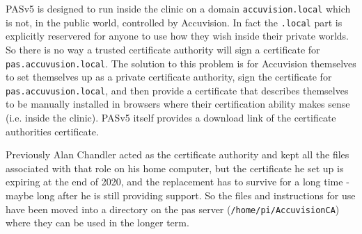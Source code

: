\documentclass[Draft]{akc}
\begin{document}
PASv5 is designed to run inside the clinic on a domain \texttt{accuvision.local} which is not, in the public world, controlled by Accuvision. In
fact the \texttt{.local} part is explicitly reservered for anyone to use how they wish inside their private worlds.  So there is no way a trusted
certificate authority will sign a certificate for \texttt{pas.accuvusion.local}.  The solution to this problem is for Accuvision themselves to set
themselves up as a private certificate authority, sign the certificate for \texttt{pas.accuvusion.local}, and then provide a certificate that describes
themselves to be manually installed in browsers where their certification ability makes sense (i.e. inside the clinic).  PASv5 itself provides a download
link of the certificate authorities certificate.

Previously Alan Chandler acted as the certificate authority and kept all the files associated with that role on his home computer, but the certificate he
set up is expiring at the end of 2020, and the replacement has to survive for a long time - maybe long after he is still providing support.  So the files
and instructions for use have been moved into a directory on the pas server (\texttt{/home/pi/AccuvisionCA}) where they can be used in the longer term.
\end{document}
